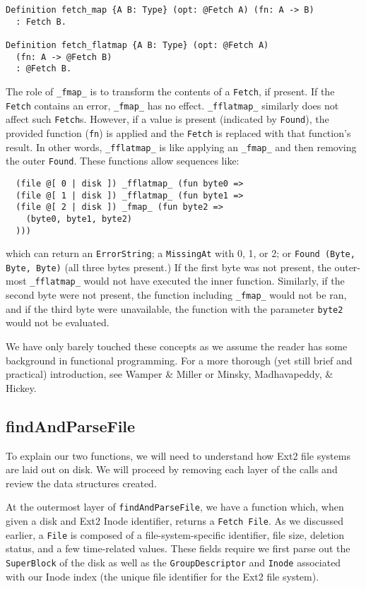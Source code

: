 \documentclass[nocopyrightspace,preprint]{sigplanconf}
\begin{document}
\begin{lstlisting}
Definition fetch_map {A B: Type} (opt: @Fetch A) (fn: A -> B)
  : Fetch B.

Definition fetch_flatmap {A B: Type} (opt: @Fetch A) 
  (fn: A -> @Fetch B)
  : @Fetch B.
\end{lstlisting}

The role of {\tt \_fmap\_} is to transform the contents of a {\tt Fetch}, if
present. If the {\tt Fetch} contains an error, {\tt \_fmap\_} has no effect.
{\tt \_fflatmap\_} similarly does not affect such {\tt Fetch}s. However, if a
value is present (indicated by {\tt Found}), the provided function ({\tt fn})
is applied and the {\tt Fetch} is replaced with that function's result. In
other words, {\tt \_fflatmap\_} is like applying an {\tt \_fmap\_} and then
removing the outer {\tt Found}. These functions allow sequences like:

\begin{lstlisting}
  (file @[ 0 | disk ]) _fflatmap_ (fun byte0 =>
  (file @[ 1 | disk ]) _fflatmap_ (fun byte1 =>
  (file @[ 2 | disk ]) _fmap_ (fun byte2 =>
    (byte0, byte1, byte2)
  )))
\end{lstlisting}

which can return an {\tt ErrorString}; a {\tt MissingAt} with 0, 1, or 2; or
{\tt Found (Byte, Byte, Byte)} (all three bytes present.) If the first byte
was not present, the outer-most {\tt \_fflatmap\_} would not have executed the
inner function. Similarly, if the second byte were not present, the function
including {\tt \_fmap\_} would not be ran, and if the third byte were
unavailable, the function with the parameter {\tt byte2} would not be
evaluated.

We have only barely touched these concepts as we assume the reader has some
background in functional programming. For a more thorough (yet still brief and
practical) introduction, see Wamper \& Miller\cite{scala} or Minsky,
Madhavapeddy, \& Hickey\cite{ocaml}.

\subsection{findAndParseFile}

To explain our two functions, we will need to understand how Ext2 file systems
are laid out on disk. We will proceed by removing each layer of the calls and
review the data structures created.

At the outermost layer of {\tt findAndParseFile}, we have a function which,
when given a disk and Ext2 Inode identifier, returns a {\tt Fetch File}. As we
discussed earlier, a {\tt File} is composed of a file-system-specific
identifier, file size, deletion status, and a few time-related values.  These
fields require we first parse out the {\tt SuperBlock} of the disk as well as
the {\tt GroupDescriptor} and {\tt Inode} associated with our Inode index (the
unique file identifier for the Ext2 file system).
\end{document}
